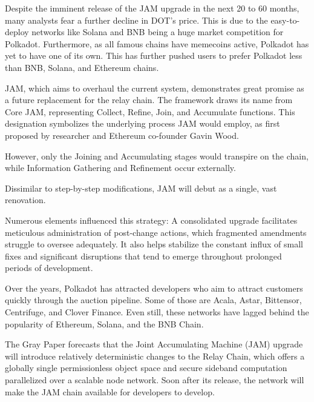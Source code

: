 \documentclass{tufte-handout}
\begin{document}
Despite the imminent release of the JAM upgrade in the next 20 to 60 months, many analysts fear a further decline in DOT's price. This is due to the easy-to-deploy
networks like Solana and BNB being a huge market competition for Polkadot. Furthermore, as all famous chains have memecoins active, Polkadot has yet to have one of its own.
This has further pushed users to prefer Polkadot less than BNB, Solana, and Ethereum chains.

JAM, which aims to overhaul the current system, demonstrates great promise as a future replacement for the relay chain. The framework draws its name from Core JAM,
representing Collect, Refine, Join, and Accumulate functions. This designation symbolizes the underlying process JAM would employ, as first proposed by researcher and
Ethereum co-founder Gavin Wood.

However, only the Joining and Accumulating stages would transpire on the chain, while Information Gathering and Refinement occur externally.

Dissimilar to step-by-step modifications, JAM will debut as a single, vast renovation.

Numerous elements influenced this strategy: A consolidated upgrade facilitates meticulous administration of post-change actions, which fragmented amendments
struggle to oversee adequately. It also helps stabilize the constant influx of small fixes and significant disruptions that tend to emerge throughout prolonged
periods of development.

Over the years, Polkadot has attracted developers who aim to attract customers quickly through the auction pipeline. Some of those are Acala, Astar, Bittensor,
Centrifuge, and Clover Finance. Even still, these networks have lagged behind the popularity of Ethereum, Solana, and the BNB Chain.

The Gray Paper forecasts that the Joint Accumulating Machine (JAM) upgrade will introduce relatively deterministic changes to the Relay Chain, which offers a
globally single permissionless object space and secure sideband computation parallelized over a scalable node network. Soon after its release,
the network will make the JAM chain available for developers to develop.




\end{document}
